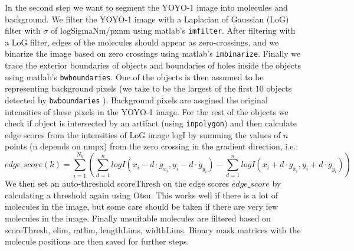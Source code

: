 \documentclass{article}
\begin{document}

In the second step we want to segment the YOYO-1 image into molecules and background. We filter the YOYO-1 image with a Laplacian of Gaussian (LoG) filter with $\sigma$ of logSigmaNm/pxnm using matlab's \texttt{imfilter}. After filtering with a LoG filter, edges of the molecules should appear as zero-crossings, and we binarize the image based on zero crossings using matlab's \texttt{imbinarize}. Finally we trace the exterior boundaries of objects and boundaries of holes inside the objects using matlab's \texttt{bwboundaries}. One of the objects is then assumed to be representing background pixels (we take to be the largest of the first $10$ objects detected by \texttt{bwboundaries} ). Background pixels are assgined the original intensities of these pixels in the YOYO-1 image. For the rest of the objects we check if object is intersected by an artifact (using \texttt{inpolygon}) and then calculate edge scores from the intensities of LoG image logI by summing the values of $n$ points (n depends on nmpx) from the zero crossing in the gradient direction, i.e.:
%
\begin{equation}
	edge\_score(k)= \sum_{i=1}^{N_k} \left( \sum_{d=1}^n logI(x_i-d\cdot g_{x_i},y_i-d\cdot g_{y_i}) -  \sum_{d=1}^n logI(x_i+d\cdot g_{x_i},y_i+d\cdot g_{y_i})\right)
\end{equation}
%
We then set an auto-threshold {\rm scoreThresh} on the edge scores $edge\_score$ by calculating a threshold again using Otsu. This works well if there is a lot of molecules in the image, but some care should be taken if there are very few molecules in the image. Finally unsuitable  molecules are filtered based on  {\rm scoreThresh, elim, ratlim, lengthLims, widthLims}. Binary mask matrices with the molecule positions are then saved for further steps.
\end{document}
